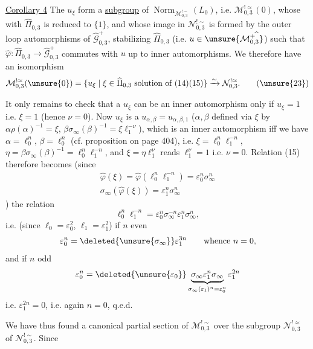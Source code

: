\uline{Corollary 4} The $u_\xi$  form a \uline{subgroup} of $\operatorname{Norm}_{\mathcal M_{0,3}^{!\sim}}(L_0)$, i.e. $\mathcal M_{0,3}^{!\approx}(0)$, whose  with $\widehat\Pi_{0,3}$ is reduced to $\{1\}$, and whose image in $\mathcal N_{0,3}^{!\sim}$ is  formed by the outer loop automorphisms of $\widehat{\mathcal G}_{0,3}^{+}$, stabilizing $\widehat\Pi_{0,3}$ (i.e. $u\in\unsure{\mathcal M_{0,3}^{+\widehat{\ }}}$) such that $\widehat\varphi:\widehat\Pi_{0,3}\to\widehat{\mathcal G}_{0,3}^{+}$ commutes with $u$ up to inner automorphisms. We therefore have an isomorphism
\[
\mathcal M_{0,3}^{!\approx}(\unsure{0})
=\{u_\xi\mid \xi\in\widehat\Pi_{0,3}\text{ solution of }(14)(15)\}
\xrightarrow{\sim}\mathcal N_{0,3}^{!\approx}.
\tag{\unsure{23}}
\]


It only remains to check that a $u_\xi$ can be an inner automorphism only if $u_\xi=1$ i.e. $\xi=1$ (hence $\nu=0$). Now $u_\xi$ is a $u_{\alpha,\beta}=u_{\alpha,\beta,1}$ ($\alpha,\beta$ defined  via $\xi$ by $\alpha\rho(\alpha)^{-1}=\xi$, $\beta\sigma_\infty(\beta)^{-1}=\xi \ell_1^{-\nu}$), which is an inner automorphism iff we have $\alpha=\ell_0^n$, $\beta=\ell_0^n$ (cf. proposition on page 404), i.e. $\xi=\ell_0^n \ell_1^{-n}$, $\eta=\beta\sigma_\infty(\beta)^{-1}=\ell_0^n \ell_1^{-n}$, and   $\xi=\eta \ell_1^\nu$ reads $\ell_1^\nu=1$ i.e. $\nu=0$. Relation (15) therefore becomes (since
\[
\begin{gathered}
\widehat\varphi(\xi)=\widehat\varphi(\ell_0^n \ell_1^{-n})=\varepsilon_0^n\sigma_\infty^n\\
\sigma_\infty(\widehat\varphi(\xi))=\varepsilon_1^n\sigma_\infty^n
\end{gathered}
\]
)  the relation
\[
\ell_0^n \ell_1^{-n}=\varepsilon_0^n\sigma_\infty^{-n}\varepsilon_1^n\sigma_\infty^n,
\]
i.e. (since $\ell_0=\varepsilon_0^2$, $\ell_1=\varepsilon_1^2$) if $n$ even
\[
\varepsilon_0^n=\deleted{\unsure{\sigma_\infty}}\varepsilon_1^{3n}
\qquad\text{whence }n=0,
\]
and if $n$ odd
\[
\varepsilon_0^n=\deleted{\unsure{\varepsilon_0}}\underbrace{\sigma_\infty\varepsilon_1^n\sigma_\infty}_{\sigma_\infty(\varepsilon_1)^n=\varepsilon_0^n}\varepsilon_1^{2n}
\]
i.e. $\varepsilon_1^{2n}=0$, i.e. again $n=0$, q.e.d.


\uline{} We have thus found a canonical partial section of $\mathcal M_{0,3}^{!\sim}$ over the subgroup $\mathcal N_{0,3}^{!\approx}$ of $\mathcal N_{0,3}^{!\sim}$. Since

